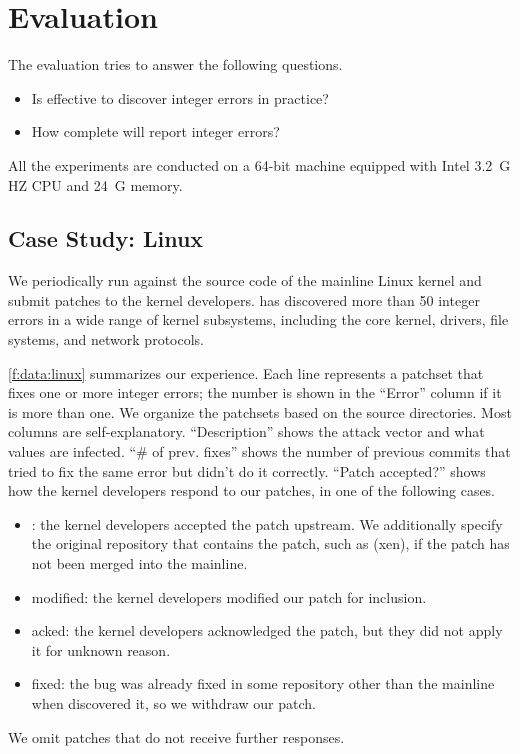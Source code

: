 \section{Evaluation}
\label{s:eval}

The evaluation tries to answer the following questions.
\begin{itemize}
\item
Is \sys effective to discover integer errors in practice?
\item
How complete will \sys report integer errors?
\end{itemize}

All the experiments are conducted on a 64-bit machine equipped with
Intel 3.2~G HZ CPU and 24~G memory.

\subsection{Case Study: Linux}
\label{s:eval:linux}

We periodically run \sys against the source code of the mainline
Linux kernel and submit patches to the kernel developers.  \sys has
discovered more than 50 integer errors in a wide range of kernel
subsystems, including the core kernel, drivers, file systems, and
network protocols.

\autoref{f:data:linux} summarizes our experience.  Each line
represents a patchset that fixes one or more integer errors; the
number is shown in the ``Error'' column if it is more than one.  We
organize the patchsets based on the source directories.  Most
columns are self-explanatory.  ``Description'' shows the attack
vector and what values are infected.  ``\# of prev. fixes'' shows
the number of previous commits that tried to fix the same error but
didn't do it correctly.  ``Patch accepted?'' shows how the kernel
developers respond to our patches, in one of the following cases.
\begin{itemize}
\item
\ok: the kernel developers accepted the patch upstream.  We
additionally specify the original repository that contains the
patch, such as (xen), if the patch has not been merged into the
mainline.
\item
modified: the kernel developers modified our patch for inclusion.
\item
acked: the kernel developers acknowledged the patch, but they
did not apply it for unknown reason.
\item
fixed: the bug was already fixed in some repository other than the
mainline when \sys discovered it, so we withdraw our patch.
\end{itemize}
We omit patches that do not receive further responses.


